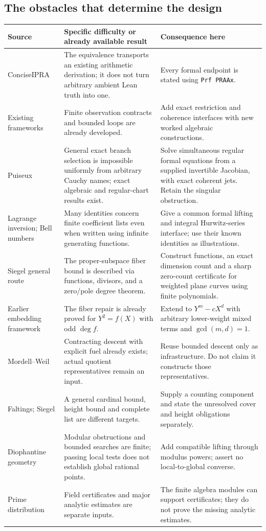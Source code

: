 \subsection{The obstacles that determine the design}

\begin{longtable}{P{.20\linewidth}P{.34\linewidth}P{.37\linewidth}}
\toprule
Source & Specific difficulty or already available result & Consequence here\\
\midrule\endhead
ConciseIPRA & The equivalence transports an existing arithmetic derivation;
it does not turn arbitrary ambient Lean truth into one. & Every formal
endpoint is stated using \texttt{Prf PRAAx}.\\[4pt]
Existing frameworks & Finite observation contracts and bounded loops are
already developed. & Add exact restriction and coherence interfaces with
new worked algebraic constructions.\\[4pt]
Puiseux & General exact branch selection is impossible uniformly from
arbitrary Cauchy names; exact algebraic and regular-chart results exist.
& Solve simultaneous regular formal equations from a supplied invertible
Jacobian, with exact coherent jets. Retain the singular obstruction.\\[4pt]
Lagrange inversion; Bell numbers & Many identities concern finite
coefficient lists even when written using infinite generating functions.
& Give a common formal lifting and integral Hurwitz-series interface;
use their known identities as illustrations.\\[4pt]
Siegel general route & The proper-subspace fiber bound is described via
functions, divisors, and a zero/pole degree theorem. & Construct functions,
an exact dimension count and a sharp zero-count certificate for weighted
plane curves using finite polynomials.\\[4pt]
Earlier embedding framework & The fiber repair is already proved for
\(Y^2=f(X)\) with odd \(\deg f\). & Extend to \(Y^m-cX^d\) with arbitrary
lower-weight mixed terms and \(\gcd(m,d)=1\).\\[4pt]
Mordell--Weil & Contracting descent with explicit fuel already exists; actual
quotient representatives remain an input. & Reuse bounded descent only
as infrastructure. Do not claim it constructs those representatives.\\[4pt]
Faltings; Siegel & A general cardinal bound, height bound and complete list
are different targets. & Supply a counting component and state the
unresolved cover and height obligations separately.\\[4pt]
Diophantine geometry & Modular obstructions and bounded searches are finite;
passing local tests does not establish global rational points. & Add
compatible lifting through modulus powers; assert no local-to-global
converse.\\[4pt]
Prime distribution & Field certificates and major analytic estimates are
separate inputs. & The finite algebra modules can support certificates;
they do not prove the missing analytic estimates.\\
\bottomrule
\end{longtable}

